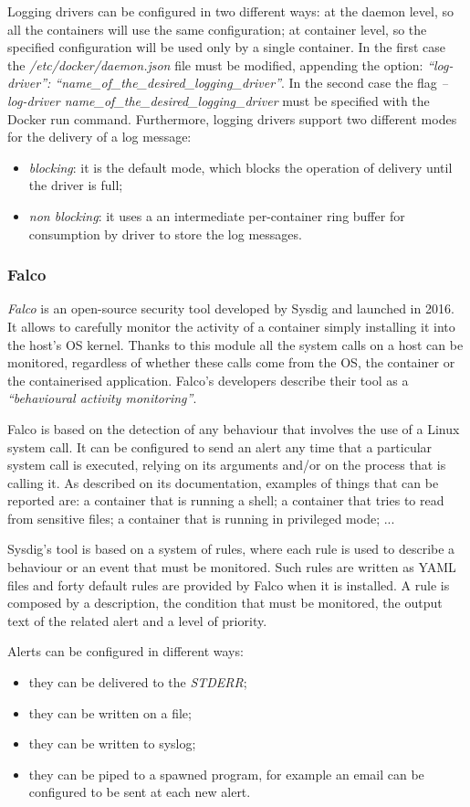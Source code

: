 \documentclass[a4paper,12pt]{article}
\begin{document}
Logging drivers can be configured in two different ways: at the daemon level, so
all the containers will use the same configuration; at container level, so the
specified configuration will be used only by a single container. In the first
case the \textit{/etc/docker/daemon.json} file must be modified, appending the
option: \textit{``log-driver'': ``name\_of\_the\_desired\_logging\_driver''}. In the
second case the flag \textit{--log-driver
name\_of\_the\_desired\_logging\_driver} must be specified with the Docker run
command. Furthermore, logging drivers support two different modes for the
delivery of a log message:
\begin{itemize} 
  \item \textit{blocking}: it is the default mode, which blocks the operation of
  delivery until the driver is full;
  \item \textit{non blocking}: it uses a an intermediate per-container ring
  buffer for consumption by driver to store the log messages.
\end{itemize}

\subsubsection{Falco}
 
\textit{Falco} \cite{sysdig_falco} is an open-source security tool developed by
Sysdig and launched in 2016. It allows to carefully monitor the activity of a
container simply installing it into the host's OS kernel. Thanks to this module
all the system calls on a host can be monitored, regardless of whether these
calls come from the OS, the container or the containerised application. Falco's
developers describe their tool as a \textit{``behavioural activity monitoring''}.
\par Falco is based on the detection of any behaviour that involves the use of a
Linux system call. It can be configured to send an alert any time that a
particular system call is executed, relying on its arguments and/or on the
process that is calling it. As described on its documentation, examples of
things that can be reported are: a container that is running a shell; a
container that tries to read from sensitive files; a container that is running
in privileged mode; ... \par Sysdig's tool is based on a system of rules, where
each rule is used to describe a behaviour or an event that must be monitored.
Such rules are written as YAML files and forty default rules are provided by
Falco when it is installed. A rule is composed by a description, the condition
that must be monitored, the output text of the related alert and a level of
priority. \par Alerts can be configured in different ways:
\begin{itemize}
  \item they can be delivered to the \textit{STDERR};
  \item they can be written on a file;
  \item they can be written to syslog;
  \item they can be piped to a spawned program, for example an email can be
  configured to be sent at each new alert.
\end{itemize}
\end{document}
